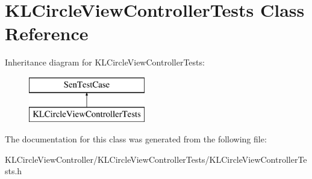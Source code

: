 \hypertarget{interface_k_l_circle_view_controller_tests}{\section{K\-L\-Circle\-View\-Controller\-Tests Class Reference}
\label{interface_k_l_circle_view_controller_tests}
}
Inheritance diagram for K\-L\-Circle\-View\-Controller\-Tests\-:\begin{figure}[H]
\begin{center}
\leavevmode
\includegraphics[height=2.000000cm]{interface_k_l_circle_view_controller_tests}
\end{center}
\end{figure}


The documentation for this class was generated from the following file\-:\begin{DoxyCompactItemize}
\item 
K\-L\-Circle\-View\-Controller/\-K\-L\-Circle\-View\-Controller\-Tests/K\-L\-Circle\-View\-Controller\-Tests.\-h\end{DoxyCompactItemize}
